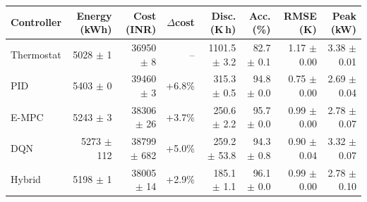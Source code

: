 \begin{tabular}{lrrrrrrr}
\toprule
Controller & Energy (kWh) & Cost (INR) & $\Delta$cost & Disc. (K\,h) & Acc. (\%) & RMSE (K) & Peak (kW)\\
\midrule
Thermostat & 5028 $\pm$ 1 & 36950 $\pm$ 8 & -- & 1101.5 $\pm$ 3.2 & 82.7 $\pm$ 0.1 & 1.17 $\pm$ 0.00 & 3.38 $\pm$ 0.01\\
PID & 5403 $\pm$ 0 & 39460 $\pm$ 3 & +6.8\% & 315.3 $\pm$ 0.5 & 94.8 $\pm$ 0.0 & 0.75 $\pm$ 0.00 & 2.69 $\pm$ 0.04\\
E-MPC & 5243 $\pm$ 3 & 38306 $\pm$ 26 & +3.7\% & 250.6 $\pm$ 2.2 & 95.7 $\pm$ 0.0 & 0.99 $\pm$ 0.00 & 2.78 $\pm$ 0.07\\
DQN & 5273 $\pm$ 112 & 38799 $\pm$ 682 & +5.0\% & 259.2 $\pm$ 53.8 & 94.3 $\pm$ 0.8 & 0.90 $\pm$ 0.04 & 3.32 $\pm$ 0.07\\
Hybrid & 5198 $\pm$ 1 & 38005 $\pm$ 14 & +2.9\% & 185.1 $\pm$ 1.1 & 96.1 $\pm$ 0.0 & 0.99 $\pm$ 0.00 & 2.78 $\pm$ 0.10\\
\bottomrule
\end{tabular}
